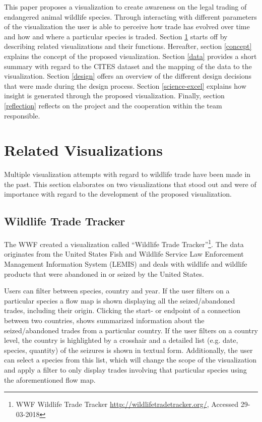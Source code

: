 This paper proposes a visualization to create awareness on the legal trading of endangered animal wildlife species. Through interacting with different parameters of the visualization the user is able to perceive how trade has evolved over time and how and where a particular species is traded. Section \ref{relatedwork} starts off by describing related visualizations and their functions. Hereafter, section \ref{concept} explains the concept of the proposed visualization. Section \ref{data} provides a short summary with regard to the CITES dataset and the mapping of the data to the visualization. Section \ref{design} offers an overview of the different design decisions that were made during the design process. Section \ref{science-excel} explains how insight is generated through the proposed visualization. Finally, section \ref{reflection} reflects on the project and the cooperation within the team responsible. 


\section{Related Visualizations} \label{relatedwork}
Multiple visualization attempts with regard to wildlife trade have been made in the past. This section elaborates on two visualizations that stood out and were of importance with regard to the development of the proposed visualization.

\subsection{Wildlife Trade Tracker}
The WWF created a visualization called ``Wildlife Trade Tracker''\footnote {WWF Wildlife Trade Tracker \url{http://wildlifetradetracker.org/}, Accessed 29-03-2018}. The data originates from the United States Fish and Wildlife Service Law Enforcement Management Information System (LEMIS) and deals with wildlife and wildlife products that were abandoned in or seized by the United States. 

Users can filter between species, country and year. If the user filters on a particular species a flow map is shown displaying all the seized/abandoned trades, including their origin. Clicking the start- or endpoint of a connection between two countries, shows summarized information about the seized/abandoned trades from a particular country. If the user filters on a country level, the country is highlighted by a crosshair and a detailed list (e.g. date, species, quantity) of the seizures is shown in textual form. Additionally, the user can select a species from this list, which will change the scope of the visualization and apply a filter to only display trades involving that particular species using the aforementioned flow map. 

